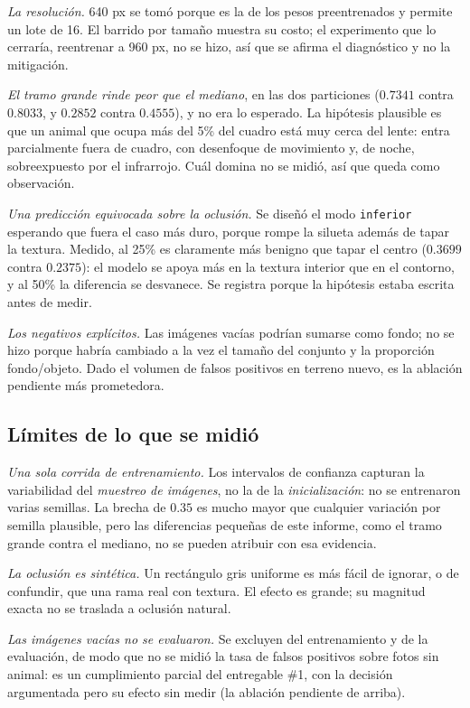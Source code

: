 \emph{La resolución.} 640 px se tomó porque es la de los pesos preentrenados y
permite un lote de 16. El barrido por tamaño muestra su costo; el experimento que
lo cerraría, reentrenar a 960 px, no se hizo, así que se afirma el diagnóstico y
no la mitigación.

\emph{El tramo grande rinde peor que el mediano}, en las dos particiones
($0.7341$ contra $0.8033$, y $0.2852$ contra $0.4555$), y no era lo esperado. La
hipótesis plausible es que un animal que ocupa más del 5\% del cuadro está muy
cerca del lente: entra parcialmente fuera de cuadro, con desenfoque de movimiento
y, de noche, sobreexpuesto por el infrarrojo. Cuál domina no se midió, así que
queda como observación.

\emph{Una predicción equivocada sobre la oclusión.} Se diseñó el modo
\texttt{inferior} esperando que fuera el caso más duro, porque rompe la silueta
además de tapar la textura. Medido, al 25\% es claramente más benigno que tapar
el centro ($0.3699$ contra $0.2375$): el modelo se apoya más en la textura
interior que en el contorno, y al 50\% la diferencia se desvanece. Se registra
porque la hipótesis estaba escrita antes de medir.

\emph{Los negativos explícitos.} Las imágenes vacías podrían sumarse como
fondo; no se hizo porque habría cambiado a la vez el tamaño del conjunto y la
proporción fondo/objeto. Dado el volumen de falsos positivos en terreno nuevo,
es la ablación pendiente más prometedora.

\subsection{Límites de lo que se midió}

\emph{Una sola corrida de entrenamiento.} Los intervalos de confianza
capturan la variabilidad del \emph{muestreo de imágenes}, no la de la
\emph{inicialización}: no se entrenaron varias semillas. La brecha de $0.35$ es
mucho mayor que cualquier variación por semilla plausible, pero las diferencias
pequeñas de este informe, como el tramo grande contra el mediano, no se pueden
atribuir con esa evidencia.

\emph{La oclusión es sintética.} Un rectángulo gris uniforme es más fácil de
ignorar, o de confundir, que una rama real con textura. El efecto es grande; su
magnitud exacta no se traslada a oclusión natural.

\emph{Las imágenes vacías no se evaluaron.} Se excluyen del entrenamiento y de
la evaluación, de modo que no se midió la tasa de falsos positivos sobre fotos
sin animal: es un cumplimiento parcial del entregable \#1, con la decisión
argumentada pero su efecto sin medir (la ablación pendiente de arriba).

